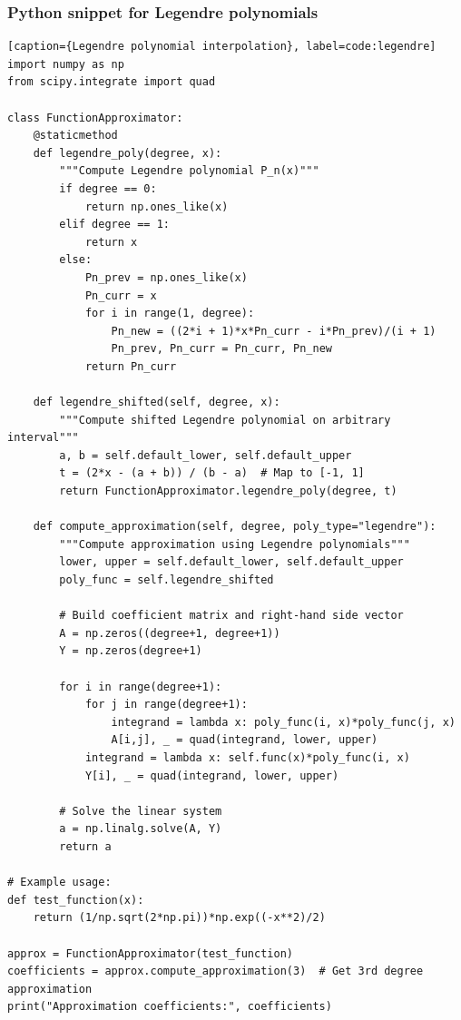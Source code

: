 \documentclass[10pt]{article}
\begin{document}
\subsubsection{Python snippet for Legendre polynomials}
\begin{lstlisting}[style=custompython][caption={Legendre polynomial interpolation}, label=code:legendre]
import numpy as np
from scipy.integrate import quad

class FunctionApproximator:
    @staticmethod
    def legendre_poly(degree, x):
        """Compute Legendre polynomial P_n(x)"""
        if degree == 0:
            return np.ones_like(x)
        elif degree == 1:
            return x
        else:
            Pn_prev = np.ones_like(x)
            Pn_curr = x
            for i in range(1, degree):
                Pn_new = ((2*i + 1)*x*Pn_curr - i*Pn_prev)/(i + 1)
                Pn_prev, Pn_curr = Pn_curr, Pn_new
            return Pn_curr

    def legendre_shifted(self, degree, x):
        """Compute shifted Legendre polynomial on arbitrary interval"""
        a, b = self.default_lower, self.default_upper
        t = (2*x - (a + b)) / (b - a)  # Map to [-1, 1]
        return FunctionApproximator.legendre_poly(degree, t)

    def compute_approximation(self, degree, poly_type="legendre"):
        """Compute approximation using Legendre polynomials"""
        lower, upper = self.default_lower, self.default_upper
        poly_func = self.legendre_shifted

        # Build coefficient matrix and right-hand side vector
        A = np.zeros((degree+1, degree+1))
        Y = np.zeros(degree+1)

        for i in range(degree+1):
            for j in range(degree+1):
                integrand = lambda x: poly_func(i, x)*poly_func(j, x)
                A[i,j], _ = quad(integrand, lower, upper)
            integrand = lambda x: self.func(x)*poly_func(i, x)
            Y[i], _ = quad(integrand, lower, upper)

        # Solve the linear system
        a = np.linalg.solve(A, Y)
        return a

# Example usage:
def test_function(x):
    return (1/np.sqrt(2*np.pi))*np.exp((-x**2)/2)

approx = FunctionApproximator(test_function)
coefficients = approx.compute_approximation(3)  # Get 3rd degree approximation
print("Approximation coefficients:", coefficients)
\end{lstlisting}
\end{document}
